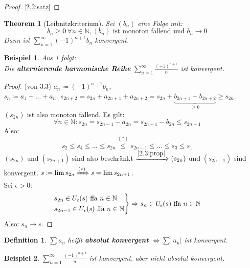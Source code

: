 \documentclass[14pt,titlepage,ngerman,a4paper,headsepline,DIV15,halfparskip*]{scrartcl}
\newcommand{\N}{\mathbb{N}}
\theoremstyle{named}
\newtheorem{namedtheorem}{Theorem} \counterwithin{namedtheorem}{section}
\theoremstyle{dotless}
\newtheorem*{beispiel*}{Beispiel}
\newtheorem*{definition}{Definition}
\begin{document}
\begin{proof}
	\ref{2.2:satz}
\end{proof}

\begin{namedtheorem}[Leibnitzkriterium] \label{3.3:prop-LeibnitzKriterium}
	Sei $(b_{n})$ eine Folge mit:
		$$ b_{n} \geq 0 ~\forall n \in \N, (b_{n}) \text{ ist monoton fallend und } b_{n} \rightarrow 0  $$
		Dann ist $\sum_{n=1}^{\infty} (-1)^{n+1}b_{n}$ konvergent.
\end{namedtheorem}

\begin{beispiel*}
	Aus \ref{3.3:prop-LeibnitzKriterium} folgt: \\
	Die \textbf{alternierende harmonische Reihe} $\sum_{n=1}^{\infty} \frac{(-1)^{n+1}}{n}$ ist konvergent.
\end{beispiel*}

\begin{proof}(von 3.3) $a_{n} \coloneqq (-1)^{n+1} b_{n}$, \\
	$s_{n} \coloneqq a_{1} + \dotsc + a_{n}$. $s_{2n+2} = s_{2n} + a_{2n+1} + a_{2n+2} = s_{2n} + \underbrace{b_{2n+1}-b_{2n+2}}_{\geq 0} \geq s_{2n}$. $(s_{2n})$ ist also monoton fallend. Es gilt:
	\[ \forall n \in \N: s_{2n} = s_{2n-1} - a_{2n} = s_{2n-1} - b_{2n} \leq s_{2n-1} \tag*{$(*)$} \]
	Also:
	$$ s_{2} \leq s_{4} \leq \dotsc \leq s_{2n} \overset{(*)}{\leq} s_{2n-1} \leq \dotsc \leq s_{3} \leq s_{1} $$
	$(s_{2n})$ und $(s_{2n+1})$ sind also beschränkt $\xRightarrow[]{\ref{2.3:prop}} (s_{2n})$ und $(s_{2n+1})$ sind konvergent. $s \coloneqq \lim s_{2n} \xRightarrow[]{(*)} s = \lim s_{2n+1}$. \\
	Sei $\epsilon > 0$:
	$$
		\begin{rcases*}
	 		s_{2n} \in U_{\epsilon}(s) \text{ ffa } n \in \N \\
	 		s_{2n-1} \in U_{\epsilon}(s) \text{ ffa } n \in \N  	
		\end{rcases*} \Rightarrow s_{n} \in U_{\epsilon}(s) \text{ ffa } n \in \N
	$$
	Also: $s_{n} \rightarrow s$.
\end{proof}

\begin{definition}
	$\sum a_{n}$ hei{\ss}t \textbf{absolut konvergent} $\iff \sum |a_{n}|$ ist konvergent.
\end{definition}


\begin{beispiel*}
	$\sum_{n=1}^{\infty} \frac{(-1)^{n+1}}{n}$ ist konvergent, aber nicht absolut konvergent.
\end{beispiel*}
\end{document}
